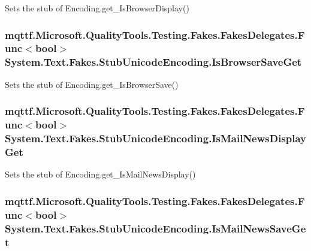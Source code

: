 Sets the stub of Encoding.\-get\-\_\-\-Is\-Browser\-Display()

\hypertarget{class_system_1_1_text_1_1_fakes_1_1_stub_unicode_encoding_abbcd411d211c5b6b31d22351a5507a82}{
\subsubsection[{Is\-Browser\-Save\-Get}]{\setlength{\rightskip}{0pt plus 5cm}mqttf.\-Microsoft.\-Quality\-Tools.\-Testing.\-Fakes.\-Fakes\-Delegates.\-Func$<$bool$>$ System.\-Text.\-Fakes.\-Stub\-Unicode\-Encoding.\-Is\-Browser\-Save\-Get}}\label{class_system_1_1_text_1_1_fakes_1_1_stub_unicode_encoding_abbcd411d211c5b6b31d22351a5507a82}


Sets the stub of Encoding.\-get\-\_\-\-Is\-Browser\-Save()

\hypertarget{class_system_1_1_text_1_1_fakes_1_1_stub_unicode_encoding_abd7f735ecb5cd3158cb8c6b091a03f89}{
\subsubsection[{Is\-Mail\-News\-Display\-Get}]{\setlength{\rightskip}{0pt plus 5cm}mqttf.\-Microsoft.\-Quality\-Tools.\-Testing.\-Fakes.\-Fakes\-Delegates.\-Func$<$bool$>$ System.\-Text.\-Fakes.\-Stub\-Unicode\-Encoding.\-Is\-Mail\-News\-Display\-Get}}\label{class_system_1_1_text_1_1_fakes_1_1_stub_unicode_encoding_abd7f735ecb5cd3158cb8c6b091a03f89}


Sets the stub of Encoding.\-get\-\_\-\-Is\-Mail\-News\-Display()

\hypertarget{class_system_1_1_text_1_1_fakes_1_1_stub_unicode_encoding_ab289762f74622f99d0d97b8de6bd2edc}{
\subsubsection[{Is\-Mail\-News\-Save\-Get}]{\setlength{\rightskip}{0pt plus 5cm}mqttf.\-Microsoft.\-Quality\-Tools.\-Testing.\-Fakes.\-Fakes\-Delegates.\-Func$<$bool$>$ System.\-Text.\-Fakes.\-Stub\-Unicode\-Encoding.\-Is\-Mail\-News\-Save\-Get}}\label{class_system_1_1_text_1_1_fakes_1_1_stub_unicode_encoding_ab289762f74622f99d0d97b8de6bd2edc}


